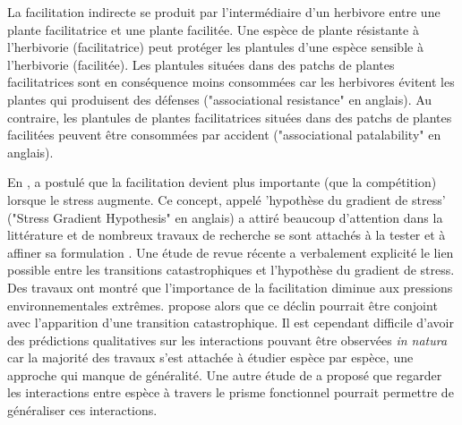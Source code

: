 \documentclass[12pt]{article} %
\begin{document}
La facilitation indirecte se produit par l'intermédiaire d'un herbivore entre une plante facilitatrice et une plante facilitée. Une espèce de plante résistante à l'herbivorie (facilitatrice) peut protéger les plantules d'une espèce sensible à l'herbivorie (facilitée). Les plantules situées dans des patchs de plantes facilitatrices sont en conséquence moins consommées car les herbivores évitent les plantes qui produisent des défenses ("associational resistance" en anglais). Au contraire, les plantules de plantes facilitatrices situées dans des patchs de plantes facilitées peuvent être consommées par accident ("associational patalability" en anglais).

En \citeyear{Bertness1994}, \citeauthor{Bertness1994} a postulé que la facilitation devient plus importante (que la compétition) lorsque le stress augmente. Ce concept, appelé 'hypothèse du gradient de stress' ("Stress Gradient Hypothesis" en anglais) a attiré beaucoup d'attention dans la littérature et de nombreux travaux de recherche se sont attachés à la tester et à affiner sa formulation \citep{ Anthelme2007,Maestre2009,He2013}. Une étude de revue récente \citep{Verwijmeren2013} a verbalement explicité le lien possible entre les transitions catastrophiques et l'hypothèse du gradient de stress. Des travaux ont montré que l'importance de la facilitation diminue aux pressions environnementales extrêmes. \citet{Verwijmeren2013} propose alors que ce déclin pourrait être conjoint avec l'apparition d'une transition catastrophique. Il est cependant difficile d'avoir des prédictions qualitatives sur les interactions pouvant être observées \textit{in natura} car la majorité des travaux s'est attachée à étudier espèce par espèce, une approche qui manque de généralité. Une autre étude de \citep{Butterfield2013} a proposé que regarder les interactions entre espèce à travers le prisme fonctionnel pourrait permettre de généraliser ces interactions. 
\end{document}
